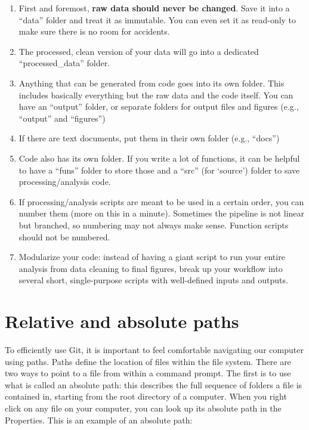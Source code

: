 \documentclass[
]{book}
\begin{document}
\begin{enumerate}
\def\labelenumi{\arabic{enumi}.}
\item
  First and foremost, \textbf{raw data should never be changed}. Save it into a ``data'' folder and treat it as immutable. You can even set it as read-only to make sure there is no room for accidents.
\item
  The processed, clean version of your data will go into a dedicated ``processed\_data'' folder.
\item
  Anything that can be generated from code goes into its own folder. This includes basically everything but the raw data and the code itself. You can have an ``output'' folder, or separate folders for output files and figures (e.g., ``output'' and ``figures'')
\item
  If there are text documents, put them in their own folder (e.g., ``docs'')
\item
  Code also has its own folder. If you write a lot of functions, it can be helpful to have a ``funs'' folder to store those and a ``src'' (for `source') folder to save processing/analysis code.
\item
  If processing/analysis scripts are meant to be used in a certain order, you can number them (more on this in a minute). Sometimes the pipeline is not linear but branched, so numbering may not always make sense. Function scripts should not be numbered.
\item
  Modularize your code: instead of having a giant script to run your entire analysis from data cleaning to final figures, break up your workflow into several short, single-purpose scripts with well-defined inputs and outputs.
\end{enumerate}

\hypertarget{relative-and-absolute-paths}{%
\section{Relative and absolute paths}\label{relative-and-absolute-paths}}

To efficiently use Git, it is important to feel comfortable navigating our computer using paths. Paths define the location of files within the file system. There are two ways to point to a file from within a command prompt. The first is to use what is called an absolute path: this describes the full sequence of folders a file is contained in, starting from the root directory of a computer. When you right click on any file on your computer, you can look up its absolute path in the Properties. This is an example of an absolute path:
\end{document}

